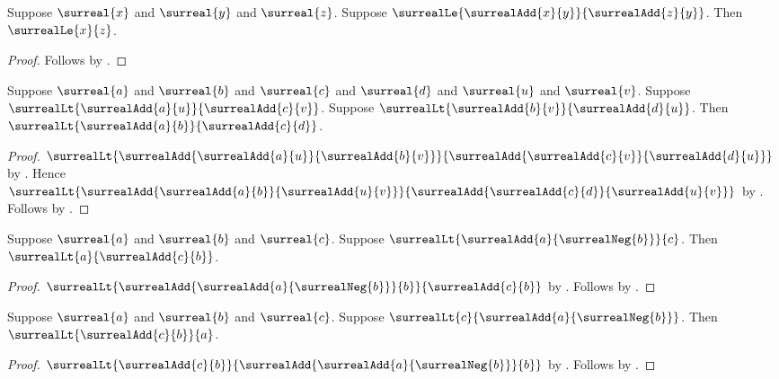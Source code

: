 \begin{corollary}\label{surreal_add_le_cancel_right}
    Suppose $\surreal{x}$ and $\surreal{y}$ and $\surreal{z}$.
    Suppose $\surrealLe{\surrealAdd{x}{y}}{\surrealAdd{z}{y}}$.
    Then $\surrealLe{x}{z}$.
\end{corollary}
\begin{proof}
    Follows by .
\end{proof}

\begin{lemma}\label{surreal_add_cross_cancel}
    Suppose $\surreal{a}$ and $\surreal{b}$ and $\surreal{c}$ and
        $\surreal{d}$ and $\surreal{u}$ and $\surreal{v}$.
    Suppose $\surrealLt{\surrealAdd{a}{u}}{\surrealAdd{c}{v}}$.
    Suppose $\surrealLt{\surrealAdd{b}{v}}{\surrealAdd{d}{u}}$.
    Then $\surrealLt{\surrealAdd{a}{b}}{\surrealAdd{c}{d}}$.
\end{lemma}
\begin{proof}
    $\surrealLt
        {\surrealAdd{\surrealAdd{a}{u}}{\surrealAdd{b}{v}}}
        {\surrealAdd{\surrealAdd{c}{v}}{\surrealAdd{d}{u}}}$
        by .
    Hence $\surrealLt
        {\surrealAdd{\surrealAdd{a}{b}}{\surrealAdd{u}{v}}}
        {\surrealAdd{\surrealAdd{c}{d}}{\surrealAdd{u}{v}}}$
        by
        .
    Follows by .
\end{proof}

\begin{lemma}\label{surreal_subtract_lt_add}
    Suppose $\surreal{a}$ and $\surreal{b}$ and $\surreal{c}$.
    Suppose $\surrealLt{\surrealAdd{a}{\surrealNeg{b}}}{c}$.
    Then $\surrealLt{a}{\surrealAdd{c}{b}}$.
\end{lemma}
\begin{proof}
    $\surrealLt
        {\surrealAdd{\surrealAdd{a}{\surrealNeg{b}}}{b}}
        {\surrealAdd{c}{b}}$
        by
        .
    Follows by
        .
\end{proof}

\begin{lemma}\label{surreal_lt_subtract_add}
    Suppose $\surreal{a}$ and $\surreal{b}$ and $\surreal{c}$.
    Suppose $\surrealLt{c}{\surrealAdd{a}{\surrealNeg{b}}}$.
    Then $\surrealLt{\surrealAdd{c}{b}}{a}$.
\end{lemma}
\begin{proof}
    $\surrealLt
        {\surrealAdd{c}{b}}
        {\surrealAdd{\surrealAdd{a}{\surrealNeg{b}}}{b}}$
        by
        .
    Follows by
        .
\end{proof}

